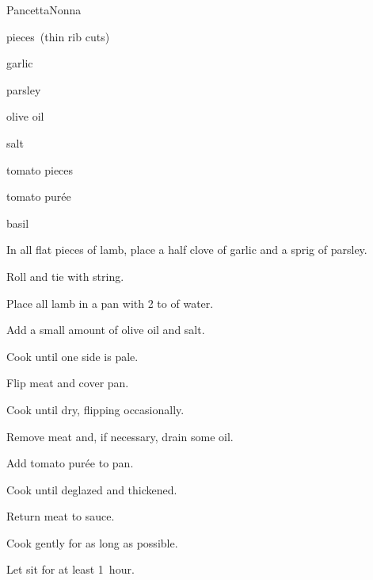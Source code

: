 \begin{recipe}{Pancetta}{Nonna}{}

\begin{ingredients}
\item {} pieces~(thin rib cuts)
\item garlic
\item parsley
\item olive oil
\item salt
\item tomato pieces
\item tomato purée
\item basil
\end{ingredients}

\begin{directions}
\item In all flat pieces of lamb, place a half clove of garlic and a sprig of parsley.
\item Roll and tie with string.
\item Place all lamb in a pan with 2 to  of water.
\item Add a small amount of olive oil and salt.
\item Cook until one side is pale.
\item Flip meat and cover pan.
\item Cook until dry, flipping occasionally.
\item Remove meat and, if necessary, drain some oil.
\item Add tomato purée to pan.
\item Cook until deglazed and thickened.
\item Return meat to sauce.
\item Cook gently for as long as possible.
\item Let sit for at least 1~hour.
\end{directions}

\end{recipe}

